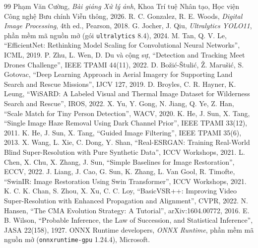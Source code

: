 \renewcommand{\refname}{Tài liệu tham khảo}
\begin{thebibliography}{99}
\setlength{\itemsep}{0pt}
\footnotesize{}
 Phạm Văn Cường, \emph{Bài giảng Xử lý ảnh}, Khoa Trí tuệ Nhân tạo, Học viện Công nghệ Bưu chính Viễn thông, 2026.
 R. C. Gonzalez, R. E. Woods, \emph{Digital Image Processing}, 4th ed., Pearson, 2018.
 G. Jocher, J. Qiu, \emph{Ultralytics YOLO11}, phần mềm mã nguồn mở (gói \texttt{ultralytics} 8.4), 2024.
 M. Tan, Q. V. Le, ``EfficientNet: Rethinking Model Scaling for Convolutional Neural Networks'', ICML, 2019.
 P. Zhu, L. Wen, D. Du và cộng sự, ``Detection and Tracking Meet Drones Challenge'', IEEE TPAMI 44(11), 2022.
 D. Božić-Štulić, Ž. Marušić, S. Gotovac, ``Deep Learning Approach in Aerial Imagery for Supporting Land Search and Rescue Missions'', IJCV 127, 2019.
 D. Broyles, C. R. Hayner, K. Leung, ``WiSARD: A Labeled Visual and Thermal Image Dataset for Wilderness Search and Rescue'', IROS, 2022.
 X. Yu, Y. Gong, N. Jiang, Q. Ye, Z. Han, ``Scale Match for Tiny Person Detection'', WACV, 2020.
 K. He, J. Sun, X. Tang, ``Single Image Haze Removal Using Dark Channel Prior'', IEEE TPAMI 33(12), 2011.
 K. He, J. Sun, X. Tang, ``Guided Image Filtering'', IEEE TPAMI 35(6), 2013.
 X. Wang, L. Xie, C. Dong, Y. Shan, ``Real-ESRGAN: Training Real-World Blind Super-Resolution with Pure Synthetic Data'', ICCV Workshops, 2021.
 L. Chen, X. Chu, X. Zhang, J. Sun, ``Simple Baselines for Image Restoration'', ECCV, 2022.
 J. Liang, J. Cao, G. Sun, K. Zhang, L. Van Gool, R. Timofte, ``SwinIR: Image Restoration Using Swin Transformer'', ICCV Workshops, 2021.
 K. C. K. Chan, S. Zhou, X. Xu, C. C. Loy, ``BasicVSR++: Improving Video Super-Resolution with Enhanced Propagation and Alignment'', CVPR, 2022.
 N. Hansen, ``The CMA Evolution Strategy: A Tutorial'', arXiv:1604.00772, 2016.
 E. B. Wilson, ``Probable Inference, the Law of Succession, and Statistical Inference'', JASA 22(158), 1927.
 ONNX Runtime developers, \emph{ONNX Runtime}, phần mềm mã nguồn mở (\texttt{onnxruntime-gpu} 1.24.4), Microsoft.
\end{thebibliography}
